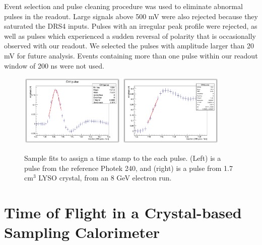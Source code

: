 \documentclass[11pt]{article}
\begin{document}
Event selection and pulse cleaning procedure was used to eliminate abnormal
pulses in the readout. Large signals above 500 mV were also rejected because
they saturated the DRS4 inputs. Pulses with an irregular peak profile were
rejected, as well as pulses which experienced a sudden reversal of polarity that
is occasionally observed with our readout. We selected the pulses with amplitude
larger than 20 mV for future analysis. Events containing more than one pulse
within our readout window of 200 ns were not used. 

\begin{figure}[h] \centering
\includegraphics[width=0.45\textwidth]{figs/RefPulseFit} 
\includegraphics[width=0.45\textwidth]{figs/ScintPulseFit} 
\caption{Sample fits to assign a time stamp to the each pulse. (Left) is a  pulse from the reference Photek 240, and (right) is a  pulse from 1.7 cm$^3$ LYSO crystal, from an 8 GeV electron run.} 
\label{fig:PulseFits}
\end{figure}


\section{Time of Flight in a Crystal-based Sampling Calorimeter}
\end{document}
